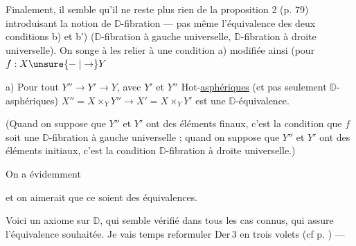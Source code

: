 
Finalement, il semble qu'il ne reste plus rien de la proposition 2 (p. 79) introduisant la notion de $\mathbb D$-fibration --- pas même l'équivalence des deux conditions b) et b') ($\mathbb D$-fibration à gauche universelle, $\mathbb D$-fibration à droite universelle). On songe à les relier à une condition a) modifiée ainsi (pour $f:X\unsure{\relbar|\to}Y$

a) Pour tout $Y''\to Y'\to Y$, avec $Y'$ et $Y''$ $\mathrm{Hot}$-\uline{asphériques} (et pas seulement $\mathbb D$-asphériques) $X''=X\times_Y Y''\longrightarrow X'=X\times_Y Y'$ est une $\mathbb D$-équivalence.

(Quand on suppose que $Y''$ et $Y'$ ont des éléments finaux, c'est la condition que $f$ soit une $\mathbb D$-fibration à gauche universelle ; quand on suppose que $Y''$ et $Y'$ ont des éléments initiaux, c'est la condition $\mathbb D$-fibration à droite universelle.)


On a évidemment


et on aimerait que ce soient des équivalences.

Voici un axiome  sur $\mathbb D$, qui  semble vérifié dans tous les cas connus, qui assure l'équivalence souhaitée. Je vais   temps reformuler $\mathrm{Der}\,3$ en trois volets (cf p. ) ---


